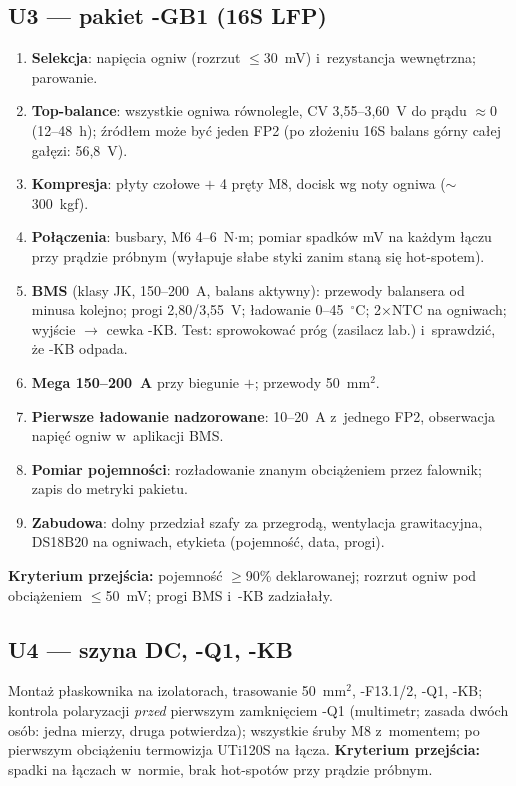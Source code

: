 \documentclass[11pt,a4paper]{article}
\newcommand{\krok}[1]{\textbf{\color{granat}Kryterium przejścia:} #1}
\begin{document}
\subsection{U3 --- pakiet -GB1 (16S LFP)}
\label{sec:u3}
\begin{enumerate}
\item \textbf{Selekcja}: napięcia ogniw (rozrzut $\le$30~mV) i~rezystancja wewnętrzna; parowanie.
\item \textbf{Top-balance}: wszystkie ogniwa równolegle, CV 3,55--3,60~V do prądu $\approx$0 (12--48~h);
źródłem może być jeden FP2 (po złożeniu 16S balans górny całej gałęzi: 56,8~V).
\item \textbf{Kompresja}: płyty czołowe $+$ 4 pręty M8, docisk wg noty ogniwa ($\sim$300~kgf).
\item \textbf{Połączenia}: busbary, M6 4--6~N$\cdot$m; pomiar spadków mV na każdym łączu przy prądzie próbnym
(wyłapuje słabe styki zanim staną się hot-spotem).
\item \textbf{BMS} (klasy JK, 150--200~A, balans aktywny): przewody balansera od minusa kolejno; progi
2,80/3,55~V; ładowanie 0--45~$^{\circ}$C; 2$\times$NTC na ogniwach; wyjście $\to$ cewka -KB. Test:
sprowokować próg (zasilacz lab.) i~sprawdzić, że -KB odpada.
\item \textbf{Mega 150--200~A} przy biegunie $+$; przewody 50~mm$^2$.
\item \textbf{Pierwsze ładowanie nadzorowane}: 10--20~A z~jednego FP2, obserwacja napięć ogniw w~aplikacji BMS.
\item \textbf{Pomiar pojemności}: rozładowanie znanym obciążeniem przez falownik; zapis do metryki pakietu.
\item \textbf{Zabudowa}: dolny przedział szafy za przegrodą, wentylacja grawitacyjna, DS18B20 na ogniwach,
etykieta (pojemność, data, progi).
\end{enumerate}
\krok{pojemność $\ge$90\% deklarowanej; rozrzut ogniw pod obciążeniem $\le$50~mV; progi BMS i~-KB zadziałały.}

\subsection{U4 --- szyna DC, -Q1, -KB}
Montaż płaskownika na izolatorach, trasowanie 50~mm$^2$, -F13.1/2, -Q1, -KB; kontrola polaryzacji
\emph{przed} pierwszym zamknięciem -Q1 (multimetr; zasada dwóch osób: jedna mierzy, druga potwierdza);
wszystkie śruby M8 z~momentem; po pierwszym obciążeniu termowizja UTi120S na łącza. \krok{spadki na łączach
w~normie, brak hot-spotów przy prądzie próbnym.}
\end{document}
